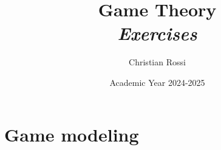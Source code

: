 \documentclass[12pt, a4paper]{report}
\title{\textbf{Game Theory} \\ \textit{Exercises}}
\author{Christian Rossi}
\date{Academic Year 2024-2025}
\begin{document}
    \maketitle

    

    \cleardoublepage

    \tableofcontents

    \cleardoublepage

    \chapter{Game modeling}
\end{document}
